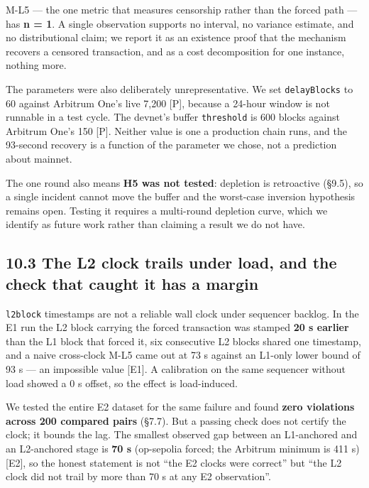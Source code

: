 \documentclass[conference]{IEEEtran}
\renewcommand{\_}{\textunderscore\allowbreak}
\begin{document}
M-L5 --- the one metric that measures censorship rather than the forced
path --- has \textbf{n = 1}. A single observation supports no interval,
no variance estimate, and no distributional claim; we report it as an
existence proof that the mechanism recovers a censored transaction, and
as a cost decomposition for one instance, nothing more.

The parameters were also deliberately unrepresentative. We set
\texttt{delayBlocks} to 60 against Arbitrum One's live 7,200 {[}P{]},
because a 24-hour window is not runnable in a test cycle. The devnet's
buffer \texttt{threshold} is 600 blocks against Arbitrum One's 150
{[}P{]}. Neither value is one a production chain runs, and the 93-second
recovery is a function of the parameter we chose, not a prediction about
mainnet.

The one round also means \textbf{H5 was not tested}: depletion is
retroactive (§9.5), so a single incident cannot move the buffer and the
worst-case inversion hypothesis remains open. Testing it requires a
multi-round depletion curve, which we identify as future work rather
than claiming a result we do not have.

\subsection{10.3 The L2 clock trails under load, and the check that
caught it has a
margin}\label{the-l2-clock-trails-under-load-and-the-check-that-caught-it-has-a-margin}

\texttt{l2\_block} timestamps are not a reliable wall clock under
sequencer backlog. In the E1 run the L2 block carrying the forced
transaction was stamped \textbf{20 s earlier} than the L1 block that
forced it, six consecutive L2 blocks shared one timestamp, and a naive
cross-clock M-L5 came out at 73 s against an L1-only lower bound of 93 s
--- an impossible value {[}E1{]}. A calibration on the same sequencer
without load showed a 0 s offset, so the effect is load-induced.

We tested the entire E2 dataset for the same failure and found
\textbf{zero violations across 200 compared pairs} (§7.7). But a passing
check does not certify the clock; it bounds the lag. The smallest
observed gap between an L1-anchored and an L2-anchored stage is
\textbf{70 s} (op-sepolia forced; the Arbitrum minimum is 411 s)
{[}E2{]}, so the honest statement is not ``the E2 clocks were correct''
but ``the L2 clock did not trail by more than 70 s at any E2
observation''.
\end{document}
